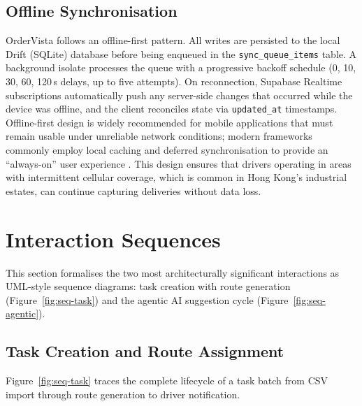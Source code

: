 \subsection{Offline Synchronisation}
\label{sec:offline-sync}

OrderVista follows an offline-first pattern.  All writes are persisted to the
local Drift (SQLite) database before being enqueued in the
\texttt{sync\_queue\_items} table.  A background isolate processes the queue
with a progressive backoff schedule (0, 10, 30, 60, 120\,s delays, up to five
attempts).  On reconnection, Supabase
Realtime subscriptions automatically push any server-side changes that
occurred while the device was offline, and the client reconciles state via
\texttt{updated\_at} timestamps.  Offline-first design is widely recommended
for mobile applications that must remain usable under unreliable network
conditions; modern frameworks commonly employ local caching and deferred
synchronisation to provide an ``always-on'' user experience
\autocite{gaur2024offlinefirst}.  This design ensures that drivers operating
in areas with intermittent cellular coverage, which is common in Hong Kong's
industrial estates, can continue capturing deliveries without data loss.

\section{Interaction Sequences}
\label{sec:sequences}

This section formalises the two most architecturally significant interactions
as UML-style sequence diagrams: task creation with route generation
(Figure~\ref{fig:seq-task}) and the agentic AI suggestion cycle
(Figure~\ref{fig:seq-agentic}).

\subsection{Task Creation and Route Assignment}
\label{sec:seq-task}

Figure~\ref{fig:seq-task} traces the complete lifecycle of a task batch from
CSV import through route generation to driver notification.

